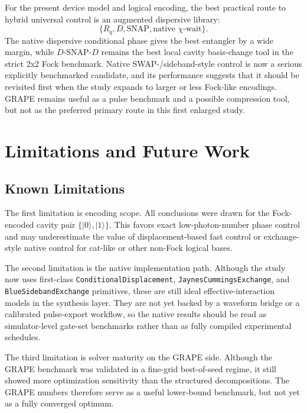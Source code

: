 \documentclass[11pt, a4paper]{article}
\begin{document}
For the present device model and logical encoding, the best practical route to
hybrid universal control is an augmented dispersive library:
\begin{equation}
\{R_q, D, \mathrm{SNAP}, \text{native }\chi\text{-wait}\}.
\end{equation}
The native dispersive conditional phase gives the best entangler by a wide
margin, while \(D\)-SNAP-\(D\) remains the best local cavity basis-change tool in
the strict 2x2 Fock benchmark. Native SWAP-/sideband-style control is now a
serious explicitly benchmarked candidate, and its performance suggests that it
should be revisited first when the study expands to larger or less Fock-like
encodings. GRAPE remains useful as a pulse benchmark and a possible compression
tool, but not as the preferred primary route in this first enlarged study.

\section{Limitations and Future Work}

\subsection{Known Limitations}
The first limitation is encoding scope. All conclusions were drawn for the
Fock-encoded cavity pair \(\{|0\rangle,|1\rangle\}\). This favors exact
low-photon-number phase control and may underestimate the value of
displacement-based fast control or exchange-style native control for cat-like or
other non-Fock logical bases.

The second limitation is the native implementation path. Although the study now
uses first-class \texttt{ConditionalDisplacement},
\texttt{JaynesCummingsExchange}, and \texttt{BlueSidebandExchange} primitives,
these are still ideal effective-interaction models in the synthesis layer. They
are not yet backed by a waveform bridge or a calibrated pulse-export workflow,
so the native results should be read as simulator-level gate-set benchmarks
rather than as fully compiled experimental schedules.

The third limitation is solver maturity on the GRAPE side. Although the GRAPE
benchmark was validated in a fine-grid best-of-seed regime, it still showed more
optimization sensitivity than the structured decompositions. The GRAPE numbers
therefore serve as a useful lower-bound benchmark, but not yet as a fully
converged optimum.
\end{document}
